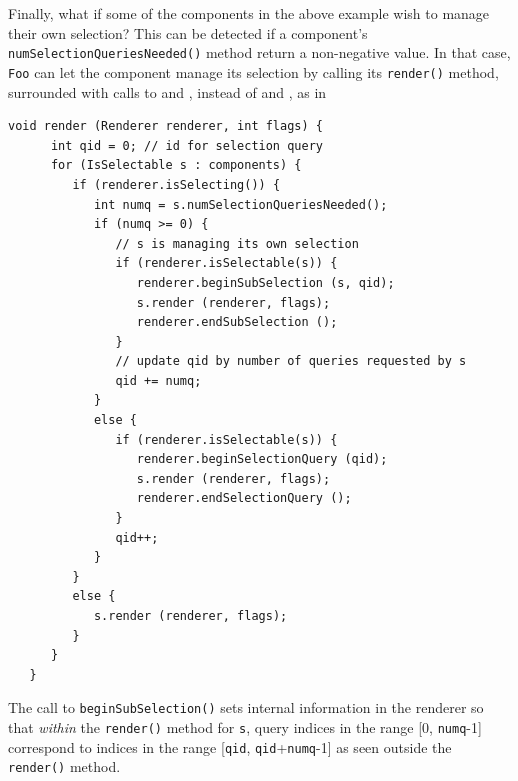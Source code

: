 Finally, what if some of the components in the above example wish to
manage their own selection? This can be detected if a component's {\tt
numSelectionQueriesNeeded()} method return a non-negative value.  In
that case, {\tt Foo} can let the component manage its selection by
calling its {\tt render()} method, surrounded with calls to
 and
, instead of
 and 
, as in
\begin{lstlisting}[]
   void render (Renderer renderer, int flags) {
      int qid = 0; // id for selection query
      for (IsSelectable s : components) {
         if (renderer.isSelecting()) {
            int numq = s.numSelectionQueriesNeeded();
            if (numq >= 0) {
               // s is managing its own selection
               if (renderer.isSelectable(s)) {
                  renderer.beginSubSelection (s, qid);
                  s.render (renderer, flags);
                  renderer.endSubSelection ();
               }
               // update qid by number of queries requested by s
               qid += numq;
            }
            else {
               if (renderer.isSelectable(s)) {
                  renderer.beginSelectionQuery (qid);
                  s.render (renderer, flags);
                  renderer.endSelectionQuery ();
               }
               qid++;
            }
         }
         else {
            s.render (renderer, flags);
         }
      }
   }
\end{lstlisting}
The call to {\tt beginSubSelection()} sets internal information in the
renderer so that {\it within} the {\tt render()} method for {\tt s},
query indices in the range [0, {\tt numq}-1] correspond to indices in
the range [{\tt qid}, {\tt qid}+{\tt numq}-1] as seen outside
the {\tt render()} method.

